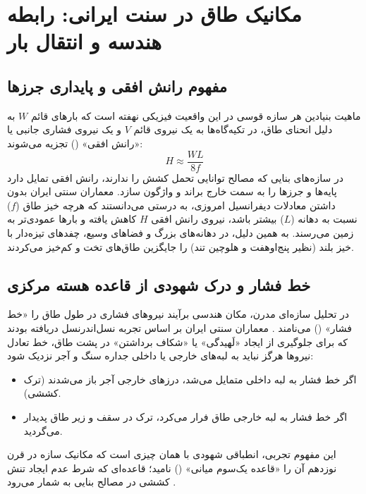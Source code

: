 \section{مکانیک طاق در سنت ایرانی: رابطه هندسه و انتقال بار}
\label{sec:ch2_traditional_mechanics}

\subsection{مفهوم رانش افقی و پایداری جرزها}
\label{subsec:ch2_horizontal_thrust}
ماهیت بنیادین هر سازه قوسی در این واقعیت فیزیکی نهفته است که بارهای قائم $W$ به دلیل انحنای طاق، در تکیه‌گاه‌ها به یک نیروی قائم $V$ و یک نیروی فشاری جانبی یا «رانش افقی» () تجزیه می‌شوند:
\begin{equation}
H \approx \frac{W L}{8f}
\label{eq:ch2_thrust_approx}
\end{equation}
در سازه‌های بنایی که مصالح توانایی تحمل کشش را ندارند، رانش افقی تمایل دارد پایه‌ها و جرزها را به سمت خارج براند و واژگون سازد. معماران سنتی ایران بدون داشتن معادلات دیفرانسیل امروزی، به درستی می‌دانستند که هرچه خیز طاق ($f$) نسبت به دهانه ($L$) بیشتر باشد، نیروی رانش افقی $H$ کاهش یافته و بارها عمودی‌تر به زمین می‌رسند. به همین دلیل، در دهانه‌های بزرگ و فضاهای وسیع، چفدهای تیزه‌دار با خیز بلند (نظیر پنج‌اوهفت و هلوچین تند) را جایگزین طاق‌های تخت و کم‌خیز می‌کردند.

\subsection{خط فشار و درک شهودی از قاعده هسته مرکزی}
\label{subsec:ch2_thrust_line_intuition}
در تحلیل سازه‌ای مدرن، مکان هندسی برآیند نیروهای فشاری در طول طاق را «خط فشار» () می‌نامند \cite{heyman1966masonry}. معماران سنتی ایران بر اساس تجربه نسل‌اندرنسل دریافته بودند که برای جلوگیری از ایجاد «لَهیدگی» یا «شکاف برداشتن» در پشت طاق، خط تعادل نیروها هرگز نباید به لبه‌های خارجی یا داخلی جداره سنگ و آجر نزدیک شود:
\begin{itemize}
    \item[$\bullet$] اگر خط فشار به لبه داخلی متمایل می‌شد، درزهای خارجی آجر باز می‌شدند (ترک کششی).
    \item[$\bullet$] اگر خط فشار به لبه خارجی طاق فرار می‌کرد، ترک در سقف و زیر طاق پدیدار می‌گردید.
\end{itemize}
این مفهوم تجربی، انطباقی شهودی با همان چیزی است که مکانیک سازه در قرن نوزدهم آن را «قاعده یک‌سوم میانی» () نامید؛ قاعده‌ای که شرط عدم ایجاد تنش کششی در مصالح بنایی به شمار می‌رود \cite{heyman1969safety}.

